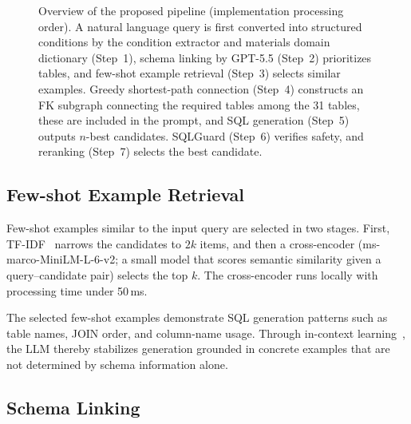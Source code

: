 \begin{figure}[htbp]
{%
}%
\caption{Overview of the proposed pipeline (implementation processing order).
  A natural language query is first converted into structured conditions by the condition extractor and materials domain dictionary (Step~1),
  schema linking by GPT-5.5 (Step~2) prioritizes tables,
  and few-shot example retrieval (Step~3) selects similar examples.
  Greedy shortest-path connection (Step~4) constructs an FK subgraph connecting the required tables among the 31 tables,
  these are included in the prompt, and SQL generation (Step~5) outputs $n$-best candidates.
  SQLGuard (Step~6) verifies safety,
  and reranking (Step~7) selects the best candidate.}
\label{fig:pipeline}
\end{figure}

\subsection{Few-shot Example Retrieval}
\label{sec:fewshot}

Few-shot examples similar to the input query are selected in two stages.
First, TF-IDF~\cite{salton1988tfidf} narrows the candidates to $2k$ items,
and then a cross-encoder (ms-marco-MiniLM-L-6-v2; a small model that scores semantic similarity given a query--candidate pair) selects the top $k$.
The cross-encoder runs locally with processing time under 50\,ms.

The selected few-shot examples demonstrate SQL generation patterns such as table names, JOIN order, and column-name usage. Through in-context learning~\cite{brown2020fewshot}, the LLM thereby stabilizes generation grounded in concrete examples that are not determined by schema information alone.

\subsection{Schema Linking}
\label{sec:schema_link}

